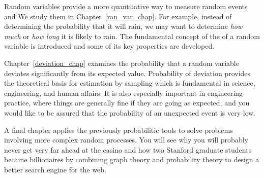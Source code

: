 Random variables provide a more quantitative way to measure random
events and We study them in Chapter~\ref{ran_var_chap}.  For example,
instead of determining the probability that it will rain, we may want
to determine \emph{how much} or \emph{how long} it is likely to rain.
The fundamental concept of the  of a random
variable is introduced and some of its key properties are developed.

Chapter~\ref{deviation_chap} examines the probability that a random
variable deviates significantly from its expected value.  Probability
of deviation provides the theoretical basis for estimation by sampling
which is fundamental in science, engineering, and human affairs.  It
is also especially important in engineering practice, where things are
generally fine if they are going as expected, and you would like to be
assured that the probability of an unexpected event is very low.


A final chapter applies the previously probabilitic tools to solve
problems involving more complex random processes.  You will see why
you will probably never get very far ahead at the casino and how two
Stanford graduate students became billionaires by combining graph
theory and probability theory to design a better search engine for the
web.

\endinput
